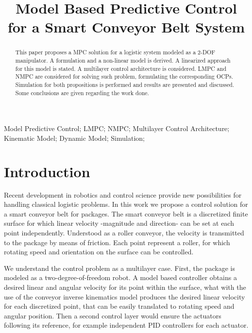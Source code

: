 \documentclass[conference]{IEEEtran}
\begin{document}
\title{Model Based Predictive Control for a Smart Conveyor Belt System}

\author{
}

\maketitle

\begin{abstract}
This paper proposes a MPC solution for a logistic system modeled as a 2-DOF manipulator. A formulation and a non-linear model is derived. A linearized approach for this model is stated. A multilayer control architecture is considered. LMPC and NMPC are considered for solving such problem, formulating the corresponding OCPs. Simulation for both propositions is performed and results are presented and discussed. Some conclusions are given regarding the work done.
\end{abstract}

\begin{IEEEkeywords}
Model Predictive Control; LMPC; NMPC; Multilayer Control Architecture; Kinematic Model; Dynamic Model; Simulation;
\end{IEEEkeywords}

\section{Introduction}

Recent development in robotics and control science provide new possibilities for handling classical logistic problems. In this work we propose a control solution for a smart conveyor belt for packages. The smart conveyor belt is a discretized finite surface for which linear velocity -magnitude and direction- can be set at each point independently. Understood as a roller conveyor, the velocity is transmitted to the package by means of friction. Each point represent a roller, for which rotating speed and orientation on the surface can be controlled.

We understand the control problem as a multilayer case. First, the package is modeled as a two-degree-of-freedom robot. A model based controller obtains a desired linear and angular velocity for its point within the surface, what with the use of the conveyor inverse kinematics model produces the desired linear velocity for each discretized point, that can be easily translated to rotating speed and angular position. Then a second control layer would ensure the actuators following its reference, for example independent PID controllers for each actuator.
\end{document}
